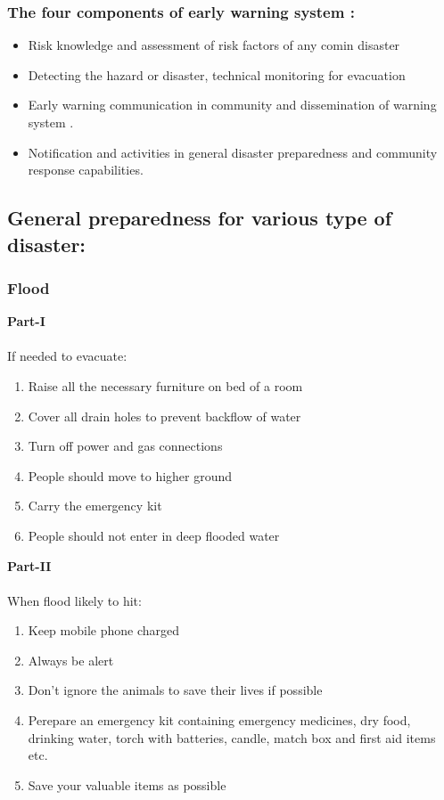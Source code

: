 \documentclass[12pt,a4paper]{article}
\begin{document}
\subsubsection*{The four components of early warning system :}
\begin{itemize}
	\item Risk knowledge and assessment of risk factors of any comin disaster
	\item Detecting the hazard or disaster, technical monitoring for evacuation 
	\item Early warning communication in community and dissemination of warning system .
	\item Notification and activities in general disaster preparedness and community response capabilities.
\end{itemize}


\subsection*{General preparedness for various type of disaster:}
\subsubsection*{Flood}
\textbf{Part-I}\\ \\
If needed to evacuate: 
\begin{enumerate}
	\item Raise all the necessary furniture on bed of a room
	\item Cover all drain holes to prevent backflow of water
	\item Turn off power and gas connections
	\item People should move to higher ground
	\item Carry the emergency kit
	\item People should not enter in deep flooded water
\end{enumerate}
\textbf{Part-II}\\\\
When flood likely to hit: 
\begin{enumerate}
	\item Keep mobile phone charged
	\item Always be alert
	\item Don't ignore the animals to save their lives if possible
	\item Perepare an emergency kit containing emergency medicines, dry food, drinking water, torch with batteries, candle, match box and first aid items etc.
	\item Save your valuable items as possible
\end{enumerate}
\end{document}
